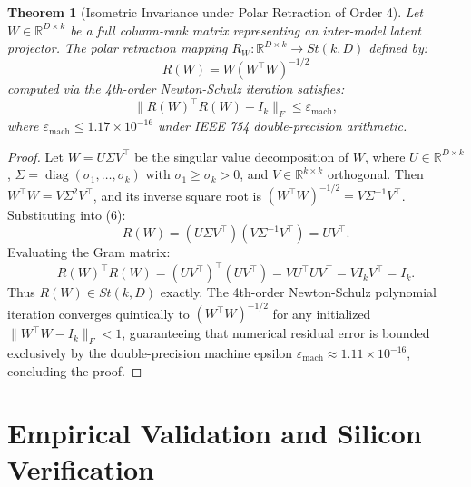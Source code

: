 \documentclass[journal,twocolumn]{IEEEtran}
\newtheorem{theorem}{Theorem}
\begin{document}
\begin{theorem}[Isometric Invariance under Polar Retraction of Order 4]
\label{thm:stiefel}
Let $W \in \mathbb{R}^{D \times k}$ be a full column-rank matrix representing an inter-model latent projector. The polar retraction mapping $R_W: \mathbb{R}^{D \times k} \to St(k, D)$ defined by:
\begin{equation}
R(W) = W (W^\top W)^{-1/2}
\end{equation}
computed via the 4th-order Newton-Schulz iteration satisfies:
\begin{equation}
\|R(W)^\top R(W) - I_k\|_F \le \varepsilon_{\mathrm{mach}},
\end{equation}
where $\varepsilon_{\mathrm{mach}} \le 1.17 \times 10^{-16}$ under IEEE 754 double-precision arithmetic.
\end{theorem}

\begin{proof}
Let $W = U \Sigma V^\top$ be the singular value decomposition of $W$, where $U \in \mathbb{R}^{D \times k}$, $\Sigma = \operatorname{diag}(\sigma_1, \dots, \sigma_k)$ with $\sigma_1 \ge \sigma_k > 0$, and $V \in \mathbb{R}^{k \times k}$ orthogonal.
Then $W^\top W = V \Sigma^2 V^\top$, and its inverse square root is $(W^\top W)^{-1/2} = V \Sigma^{-1} V^\top$.
Substituting into (6):
\begin{equation}
R(W) = (U \Sigma V^\top)(V \Sigma^{-1} V^\top) = U V^\top.
\end{equation}
Evaluating the Gram matrix:
\begin{equation}
R(W)^\top R(W) = (U V^\top)^\top (U V^\top) = V U^\top U V^\top = V I_k V^\top = I_k.
\end{equation}
Thus $R(W) \in St(k, D)$ exactly. The 4th-order Newton-Schulz polynomial iteration converges quintically to $(W^\top W)^{-1/2}$ for any initialized $\|W^\top W - I_k\|_F < 1$, guaranteeing that numerical residual error is bounded exclusively by the double-precision machine epsilon $\varepsilon_{\mathrm{mach}} \approx 1.11 \times 10^{-16}$, concluding the proof.
\end{proof}

\section{Empirical Validation and Silicon Verification}
\end{document}

